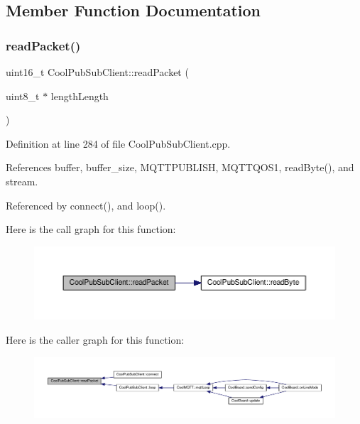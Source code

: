 \subsection{Member Function Documentation}
\mbox{\label{class_cool_pub_sub_client_a25a8779149cfa809b7c06f63568b25cf}} 
\subsubsection{\texorpdfstring{read\+Packet()}{readPacket()}}
{\footnotesize\ttfamily uint16\+\_\+t Cool\+Pub\+Sub\+Client\+::read\+Packet (\begin{DoxyParamCaption}\item[{uint8\+\_\+t $\ast$}]{length\+Length }\end{DoxyParamCaption})\hspace{0.3cm}{\ttfamily [private]}}



Definition at line 284 of file Cool\+Pub\+Sub\+Client.\+cpp.



References buffer, buffer\+\_\+size, M\+Q\+T\+T\+P\+U\+B\+L\+I\+SH, M\+Q\+T\+T\+Q\+O\+S1, read\+Byte(), and stream.



Referenced by connect(), and loop().

Here is the call graph for this function\+:\nopagebreak
\begin{figure}[H]
\begin{center}
\leavevmode
\includegraphics[width=350pt]{d8/d4b/class_cool_pub_sub_client_a25a8779149cfa809b7c06f63568b25cf_cgraph}
\end{center}
\end{figure}
Here is the caller graph for this function\+:\nopagebreak
\begin{figure}[H]
\begin{center}
\leavevmode
\includegraphics[width=350pt]{d8/d4b/class_cool_pub_sub_client_a25a8779149cfa809b7c06f63568b25cf_icgraph}
\end{center}
\end{figure}
\mbox{\label{class_cool_pub_sub_client_ad409bbd287d5894f0cf082f62446c002}} 
